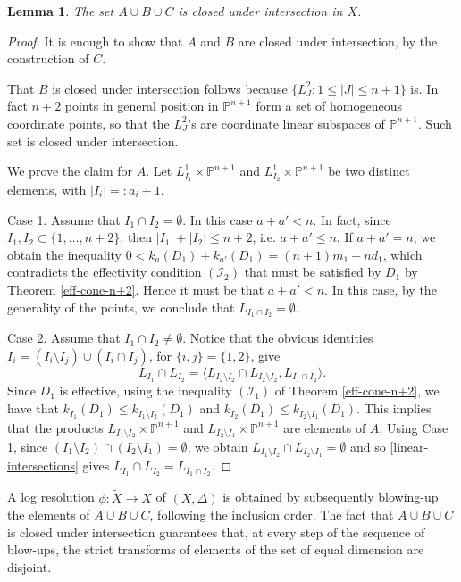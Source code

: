 \documentclass[a4paper,11pt]{article}
\newtheorem{lemma}[theorem]{Lemma}
\newcommand{\PP}{\mathbb P}
\begin{document}
\begin{lemma}
The set $A\cup B\cup C$ is closed under intersection in $X$.
\end{lemma}
\begin{proof}
It is enough to show that $A$ and $B$ are closed under intersection, by the construction of $C$.

That $B$ is closed under intersection follows because  $\{L^2_J: 1\le |J|\le n+1\}$ is. In fact $n+2$ points in general position in $\PP^{n+1}$ form a set of homogeneous coordinate points, so that the $L^2_J$'s are coordinate linear subspaces of $\PP^{n+1}$. Such set is closed under intersection.


We prove the claim for $A$. Let $L^1_{I_1}\times\PP^{n+1}$ and $L^1_{I_2}\times\PP^{n+1}$ be two distinct elements, with $|I_i|=:a_i+1$.

Case 1. Assume that $I_1\cap I_2=\emptyset$. In this case $a+a'< n$. In fact, since $I_1,I_2\subset\{1,\dots,n+2\}$, then $|I_1|+|I_2|\le n+2$, i.e. $a+a'\le n$. If $a+a'=n$, we obtain the inequality $0<k_a(D_1)+k_{a'}(D_1)=(n+1)m_1-nd_1$, which contradicts the effectivity condition $(\mathcal{I}_2)$ that must be satisfied by $D_1$ by Theorem \ref{eff-cone-n+2}.
Hence it must be that $a+a'<n$. In this case, by the generality of the points, we conclude that $L_{I_1\cap I_2}=\emptyset$. 


Case 2.  Assume that $I_1\cap I_2\ne\emptyset$. Notice that the obvious identities 
$I_i=(I_i\setminus I_j) \cup (I_i\cap I_j)$, for $\{i,j\}=\{1,2\}$, give
\begin{equation}\label{linear-intersections}L_{I_1}\cap L_{I_2}=\langle L_{I_2\setminus I_2}\cap L_{I_2\setminus I_2}, L_{I_1\cap I_2}\rangle.\end{equation}
Since $D_1$ is effective, using the inequality $(\mathcal{I}_1)$ of Theorem \ref{eff-cone-n+2}, we have that $k_{I_1}(D_1)\le k_{I_1\setminus I_2}(D_1)$ and  $k_{I_2}(D_1)\le k_{I_2\setminus I_1}(D_1)$. This implies that the products $L_{I_1\setminus I_2}\times\PP^{n+1}$ and $L_{I_2\setminus I_1}\times\PP^{n+1}$ are elements of $A$. Using Case 1,  since $(I_1\setminus I_2)\cap (I_2\setminus I_1)=\emptyset$, we obtain $L_{I_1\setminus I_2}\cap L_{I_2\setminus I_1}=\emptyset$ and so \eqref{linear-intersections} gives $L_{I_1}\cap L_{I_2}= L_{I_1\cap I_2}.$
\end{proof}

A log resolution $\phi: \widetilde{X}\to X$ of $(X,\Delta)$ is obtained by subsequently blowing-up the elements of $A\cup B\cup C$, following the inclusion order. The fact that $A\cup B\cup C$ is closed under intersection guarantees that, at every step of the sequence of blow-ups, the strict transforms of elements of the set of equal dimension are disjoint.
\end{document}
